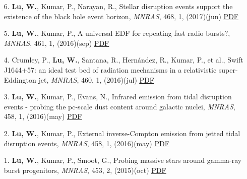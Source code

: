 \begin{itemize}[leftmargin=0.65cm]
\vspace{-0.1cm}
\item[6.]{{\bf Lu, W.}, Kumar, P., Narayan, R., {Stellar disruption events support the existence of the black hole event horizon}, {\it MNRAS}, 468, 1, (2017)(jun) \href{https://ui.adsabs.harvard.edu/abs/2017MNRAS.468..910L}{\underline{PDF}}}

\vspace{-0.1cm}
\item[5.]{{\bf Lu, W.}, Kumar, P., {A universal EDF for repeating fast radio bursts?}, {\it MNRAS}, 461, 1, (2016)(sep) \href{https://ui.adsabs.harvard.edu/abs/2016MNRAS.461L.122L}{\underline{PDF}}}

\vspace{-0.1cm}
\item[4.]{Crumley, P., {\bf Lu, W.}, Santana, R., Hern{\'a}ndez, R., Kumar, P., et al., {Swift J1644+57: an ideal test bed of radiation mechanisms in a relativistic super-Eddington jet}, {\it MNRAS}, 460, 1, (2016)(jul) \href{https://ui.adsabs.harvard.edu/abs/2016MNRAS.460..396C}{\underline{PDF}}}

\vspace{-0.1cm}
\item[3.]{{\bf Lu, W.}, Kumar, P., Evans, N., {Infrared emission from tidal disruption events - probing the pc-scale dust content around galactic nuclei}, {\it MNRAS}, 458, 1, (2016)(may) \href{https://ui.adsabs.harvard.edu/abs/2016MNRAS.458..575L}{\underline{PDF}}}

\vspace{-0.1cm}
\item[2.]{{\bf Lu, W.}, Kumar, P., {External inverse-Compton emission from jetted tidal disruption events}, {\it MNRAS}, 458, 1, (2016)(may) \href{https://ui.adsabs.harvard.edu/abs/2016MNRAS.458.1071L}{\underline{PDF}}}

\vspace{-0.1cm}
\item[1.]{{\bf Lu, W.}, Kumar, P., Smoot, G., {Probing massive stars around gamma-ray burst progenitors}, {\it MNRAS}, 453, 2, (2015)(oct) \href{https://ui.adsabs.harvard.edu/abs/2015MNRAS.453.1458L}{\underline{PDF}}}
\end{itemize}